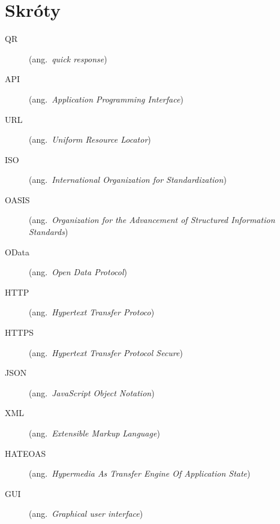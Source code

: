 \chapter*{Skróty}\mbox{}
\label{sec:skroty}
\noindent
\begin{description}
  \item [QR] (ang.\ \emph{quick response})
  \item [API] (ang.\ \emph{Application Programming Interface})
  \item [URL] (ang.\ \emph{Uniform Resource Locator})
  \item [ISO] (ang.\ \emph{International Organization for Standardization})
  \item [OASIS] (ang.\ \emph{Organization for the Advancement of Structured Information Standards})
  \item [OData] (ang.\ \emph{Open Data Protocol})
  \item [HTTP] (ang.\ \emph{Hypertext Transfer Protoco})
  \item [HTTPS] (ang.\ \emph{Hypertext Transfer Protocol Secure})
  \item [JSON] (ang.\ \emph{JavaScript Object Notation})
  \item [XML] (ang.\ \emph{Extensible Markup Language})
  \item [HATEOAS] (ang.\ \emph{Hypermedia As Transfer Engine Of Application State})
  \item [GUI] (ang.\ \emph{Graphical user interface})
\end{description}
